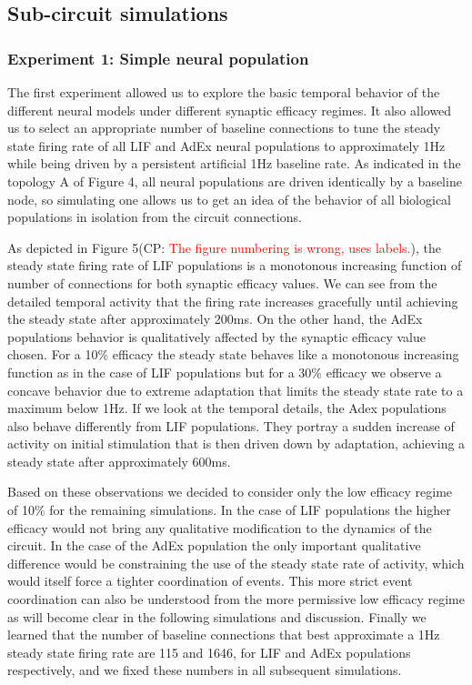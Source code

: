 \documentclass[10pt]{article}
\newcommand{\noteCP}[1]{(CP: \textcolor{red}{#1})}
\begin{document}
{\label{765620}}

\subsection{Sub-circuit simulations}

{\label{152250}}

\subsubsection{Experiment 1: Simple neural population}

{\label{461536}}

The first experiment allowed us to explore the basic temporal behavior of the different neural models under different synaptic efficacy regimes.
It also allowed us to select an appropriate number of baseline connections to tune the steady state firing rate of all LIF and AdEx neural populations to approximately 1Hz while being driven by a persistent artificial 1Hz baseline rate.
As indicated in the topology A of Figure 4, all neural populations are driven identically by a baseline node, so simulating one allows us to get an idea of the behavior of all biological populations in isolation from the circuit connections.

As depicted in Figure 5\noteCP{The figure numbering is wrong, uses labels.}, the steady state firing rate of LIF populations is a monotonous increasing function of number of connections for both synaptic efficacy values.
We can see from the detailed temporal activity that the firing rate increases gracefully until achieving the steady state after approximately 200ms.
On the other hand, the AdEx populations behavior is qualitatively affected by the synaptic efficacy value chosen. 
For a 10\% efficacy the steady state behaves like a monotonous increasing function as in the case of LIF populations but for a 30\% efficacy we observe a concave behavior due to extreme adaptation that limits the steady state rate to a maximum below 1Hz.
If we look at the temporal details, the Adex populations also behave differently from LIF populations.
They portray a sudden increase of activity on initial stimulation that is then driven down by adaptation, achieving a steady state after approximately 600ms.

Based on these observations we decided to consider only the low efficacy regime of 10\% for the remaining simulations.
In the case of LIF populations the higher efficacy would not bring any qualitative modification to the dynamics of the circuit.
In the case of the AdEx population the only important qualitative difference would be constraining the use of the steady state rate of activity, which would itself force a tighter coordination of events.
This more strict event coordination can also be understood from the more permissive low efficacy regime as will become clear in the following simulations and discussion.
Finally we learned that the number of baseline connections that best approximate a 1Hz steady state firing rate are 115 and 1646, for LIF and AdEx populations respectively, and we fixed these numbers in all subsequent simulations.
\end{document}
